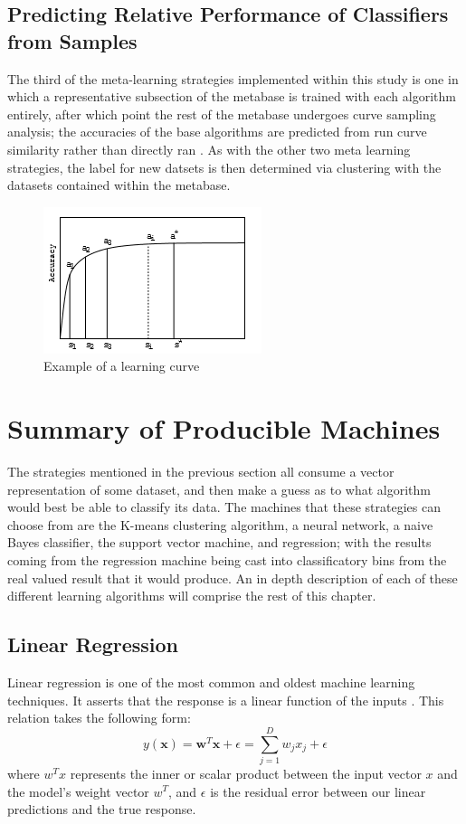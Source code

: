 \subsection{Predicting Relative Performance of Classifiers from Samples}
The third of the meta-learning strategies implemented within this study is one in
which a representative subsection of the metabase is trained with each algorithm
entirely, after which point the rest of the metabase undergoes curve
sampling analysis; the accuracies of the base algorithms are predicted from
run curve similarity rather than directly ran \cite{Leite}.
As with the other two meta learning strategies, the label for new datsets is
then determined via clustering with the datasets contained within the metabase.
\begin{figure}[h]
\includegraphics{Chapters/Images/LearningCurve/LearningCurve.PNG}
\caption{Example of a learning curve}
\centering
\end{figure}
\section{Summary of Producible Machines}
The strategies mentioned in the previous section all consume a vector
representation of some dataset, and then make a guess as to what algorithm would best
be able to classify its data. The machines that these strategies can choose from are
the K-means clustering algorithm, a neural network, a naive Bayes classifier, the support
vector machine, and regression; with the results coming from the regression
machine being cast into classificatory bins from the real valued result that it
would produce. An in depth description of each of these different learning
algorithms will comprise the rest of this chapter.
\subsection{Linear Regression}
Linear regression is one of the most common and oldest machine learning
techniques. It asserts that the response is a linear function
of the inputs \cite{Murphy}. This relation takes the following form:
$$ y(\textbf{x}) = \textbf{w}^T\textbf{x} + \epsilon = \sum_{j=1}^{D}w_jx_j + \epsilon $$
where $w^Tx$ represents the inner or scalar product between the input vector $x$
and the model's weight vector $w^T$, and $\epsilon$ is the residual error
between our linear predictions and the true response.

